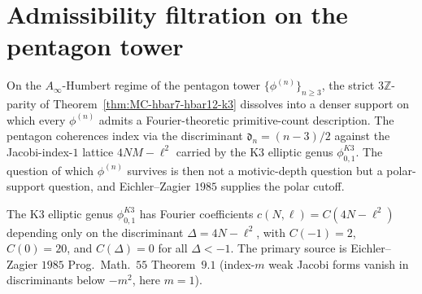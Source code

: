 \section{Admissibility filtration on the pentagon tower}
\label{sec:bc-admissibility-filtration}

On the $A_\infty$-Humbert regime of the pentagon tower
$\{\phi^{(n)}\}_{n\ge 3}$, the strict $3\mathbb{Z}$-parity of
Theorem~\ref{thm:MC-hbar7-hbar12-k3} dissolves into a denser support on
which every $\phi^{(n)}$ admits a Fourier-theoretic primitive-count
description. The pentagon coherences index via the discriminant
$\mathfrak d_n = (n-3)/2$ against the Jacobi-index-$1$ lattice $4NM - \ell^2$
carried by the K3 elliptic genus $\phi^{K3}_{0,1}$. The question of
which $\phi^{(n)}$ survives is then not a motivic-depth question but a
polar-support question, and Eichler--Zagier $1985$ supplies the
polar cutoff.

\begin{lemma}
\label{lem:bc-polar-support-phi-K3}
\ClaimStatusProvedElsewhere
The K3 elliptic genus $\phi^{K3}_{0,1}$ has Fourier coefficients
$c(N, \ell) = C(4N - \ell^2)$ depending only on the discriminant
$\Delta = 4N - \ell^2$, with
$C(-1) = 2$, $C(0) = 20$, and
$C(\Delta) = 0$ for all $\Delta < -1$. The primary source is
Eichler--Zagier $1985$ \textup{Prog.~Math.}~$55$ Theorem~$9.1$
(index-$m$ weak Jacobi forms vanish in discriminants below $-m^2$, here
$m = 1$).
\end{lemma}

